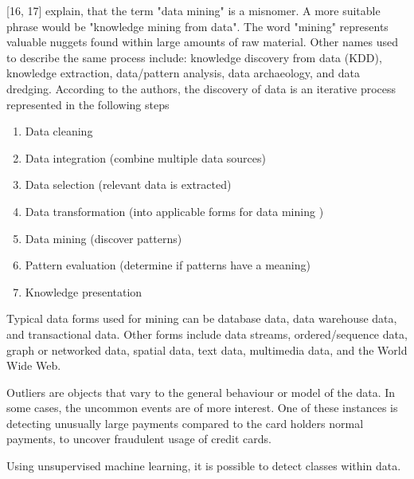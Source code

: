 

\textcite{han2011data}[16, 17] explain, that the term "data mining" is a misnomer. A more suitable phrase would be "knowledge mining from data". The word "mining" represents valuable nuggets found within large amounts of raw material. Other names used to describe the same process include: knowledge discovery from data (KDD), knowledge extraction, data/pattern analysis, data archaeology, and data dredging.
According to the authors, the discovery of data is an iterative process represented in the following steps

\begin{enumerate}
  \item Data cleaning
  \item Data integration (combine multiple data sources)
  \item Data selection (relevant data is extracted)
  \item Data transformation (into applicable forms for data mining )
  \item Data mining (discover patterns)
  \item Pattern evaluation (determine if patterns have a meaning)
  \item Knowledge presentation
\end{enumerate}

Typical data forms used for mining can be database data, data warehouse data, and transactional data. Other forms include data streams, ordered/sequence data, graph or networked data, spatial data, text data, multimedia data, and the World Wide Web.

Outliers are objects that vary to the general behaviour or model of the data. In some cases, the uncommon events are of more interest. One of these instances is detecting unusually large payments compared to the card holders normal payments, to uncover fraudulent usage of credit cards.

Using unsupervised machine learning, it is possible to detect classes within data.

